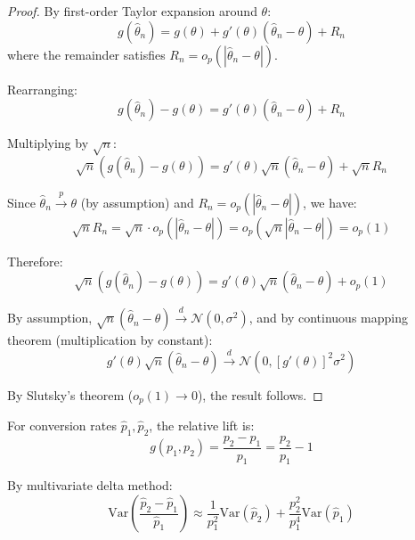 \begin{proof}
By first-order Taylor expansion around $\theta$:
\begin{equation}
g(\hat{\theta}_n) = g(\theta) + g'(\theta)(\hat{\theta}_n - \theta) + R_n
\end{equation}
where the remainder satisfies $R_n = o_p(|\hat{\theta}_n - \theta|)$.

Rearranging:
\begin{equation}
g(\hat{\theta}_n) - g(\theta) = g'(\theta)(\hat{\theta}_n - \theta) + R_n
\end{equation}

Multiplying by $\sqrt{n}$:
\begin{equation}
\sqrt{n}(g(\hat{\theta}_n) - g(\theta)) = g'(\theta)\sqrt{n}(\hat{\theta}_n - \theta) + \sqrt{n}R_n
\end{equation}

Since $\hat{\theta}_n \xrightarrow{p} \theta$ (by assumption) and $R_n = o_p(|\hat{\theta}_n - \theta|)$, we have:
\begin{equation}
\sqrt{n}R_n = \sqrt{n} \cdot o_p(|\hat{\theta}_n - \theta|) = o_p(\sqrt{n}|\hat{\theta}_n - \theta|) = o_p(1)
\end{equation}

Therefore:
\begin{equation}
\sqrt{n}(g(\hat{\theta}_n) - g(\theta)) = g'(\theta)\sqrt{n}(\hat{\theta}_n - \theta) + o_p(1)
\end{equation}

By assumption, $\sqrt{n}(\hat{\theta}_n - \theta) \xrightarrow{d} \mathcal{N}(0, \sigma^2)$, and by continuous mapping theorem (multiplication by constant):
\begin{equation}
g'(\theta)\sqrt{n}(\hat{\theta}_n - \theta) \xrightarrow{d} \mathcal{N}(0, [g'(\theta)]^2\sigma^2)
\end{equation}

By Slutsky's theorem ($o_p(1) \to 0$), the result follows.
\end{proof}

\begin{example}
For conversion rates $\hat{p}_1, \hat{p}_2$, the relative lift is:
\begin{equation}
g(p_1, p_2) = \frac{p_2 - p_1}{p_1} = \frac{p_2}{p_1} - 1
\end{equation}

By multivariate delta method:
\begin{equation}
\text{Var}\left(\frac{\hat{p}_2 - \hat{p}_1}{\hat{p}_1}\right) \approx \frac{1}{p_1^2}\text{Var}(\hat{p}_2) + \frac{p_2^2}{p_1^4}\text{Var}(\hat{p}_1)
\end{equation}
\end{example}

